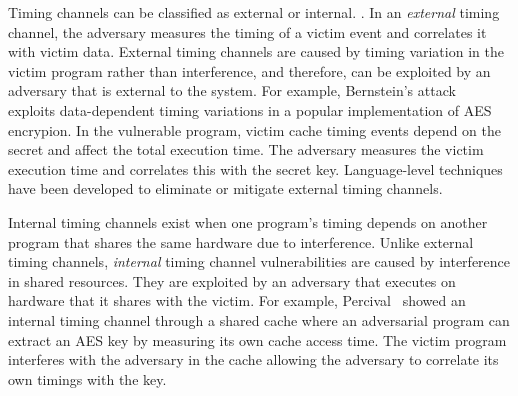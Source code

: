 Timing channels can be classified as external or internal.
\cite{mitigation3}.  In an {\em external} timing channel, the adversary measures 
the timing of a victim event and correlates it with victim data. 
External 
timing channels are caused by timing variation in the victim program rather 
than interference, and therefore, can be exploited by an adversary that is 
external to the system.
For example, Bernstein's attack~\cite{bernstein} exploits data-dependent
timing variations in a popular implementation of AES encrypion.  In the 
vulnerable program, victim cache timing events depend on the secret and affect 
the total execution time. The adversary measures the victim execution time and 
correlates this with the secret key.
Language-level techniques have been developed to
eliminate \cite{timesens} or mitigate \cite{mitigation1,mitigation2,mitigation3} 
external timing channels.


Internal timing channels exist when one program's timing depends on another
program that shares the same hardware due to interference. Unlike external 
timing channels, {\em internal} timing channel vulnerabilities are caused by 
interference in shared resources.
They are exploited by an adversary that executes on hardware that it shares with 
the victim.
For example, Percival~\cite{percival} showed an internal timing channel
through a shared cache where an adversarial program can extract an AES key
by measuring its own cache access time. The victim program interferes with the 
adversary in the cache allowing the adversary to correlate its own timings with 
the key.

